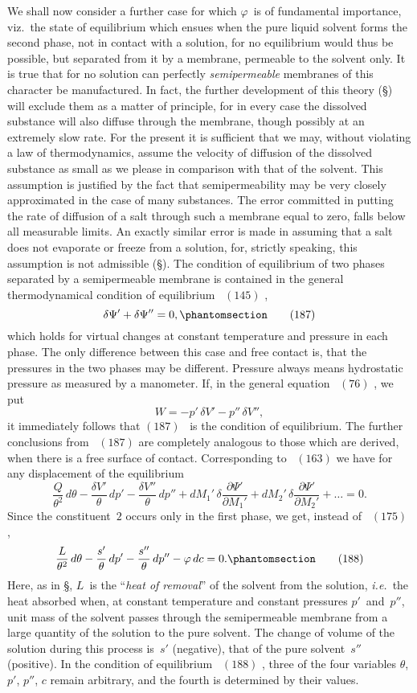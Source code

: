 \documentclass[12pt]{book}[2005/09/16]
\newcommand{\SecRef}[2][§\;]{\hyperref[section:#2.]{{\upshape #1#2}}}
\newcommand{\Tag}[1]{%
  \phantomsection\label{eqn:#1}\tag*{\ensuremath{#1}}%
}
\newcommand{\Eq}[1]{%
  \hyperref[eqn:#1]{\ensuremath{#1}}%
}
\newcommand{\PageSep}[1]{\ignorespaces}
\newcommand{\ie}{\emph{i.e.}}
\newcommand{\dd}{\partial}
\begin{document}
We shall now consider a further case for which $\varphi$~is of
%
%
fundamental importance, viz.\ the state of equilibrium which
ensues when the pure liquid solvent forms the second phase,
not in contact with a solution, for no equilibrium would
thus be possible, but separated from it by a membrane,
permeable to the solvent only. It is true that for no
solution can perfectly \emph{semipermeable} membranes of this character
be manufactured. In fact, the further development of
this theory (\SecRef{259}) will exclude them as a matter of principle,
for in every case the dissolved substance will also
diffuse through the membrane, though possibly at an
extremely slow rate. For the present it is sufficient that
we may, without violating a law of thermodynamics, assume
the velocity of diffusion of the dissolved substance as small
as we please in comparison with that of the solvent. This
assumption is justified by the fact that semipermeability
may be very closely approximated in the case of many
substances. The error committed in putting the rate of
diffusion of a salt through such a membrane equal to zero,
falls below all measurable limits. An exactly similar error
is made in assuming that a salt does not evaporate or
freeze from a solution, for, strictly speaking, this assumption
is not admissible (\SecRef{259}). The condition of equilibrium
of two phases separated by a semipermeable membrane is
contained in the general thermodynamical condition of
equilibrium~\Eq{(145)},
\[
\delta \Psi' + \delta \Psi'' = 0,
\Tag{(187)}
\]
which holds for virtual changes at constant temperature
and pressure in each phase. The only difference between
this case and free contact is, that the pressures in the two
phases may be different. Pressure always means hydrostatic
pressure as measured by a manometer. If, in the general
equation~\Eq{(76)}, we put
\[
W = -p'\, \delta V' - p''\, \delta V'',
\]
it immediately follows that \Eq{(187)}~is the condition of equilibrium.
The further conclusions from~\Eq{(187)} are completely
\PageSep{204}
analogous to those which are derived, when there is a free
surface of contact. Corresponding to~\Eq{(163)} we have for any
displacement of the equilibrium
\[
\frac{Q}{\theta^{2}}\, d\theta - \frac{\delta V'}{\theta}\, dp' - \frac{\delta V''}{\theta}\, dp''
  + dM_{1}'\, \delta \frac{\dd \Psi'}{\dd M_{1}'} + dM_{2}'\, \delta \frac{\dd \Psi'}{\dd M_{2}'} + \dots = 0.
\]
Since the constituent~$2$ occurs only in the first phase, we get,
instead of~\Eq{(175)},
\[
\frac{L}{\theta^{2}}\, d\theta - \frac{s'}{\theta}\, dp' - \frac{s''}{\theta}\, dp'' - \varphi\, dc = 0.
\Tag{(188)}
\]
Here, as in \SecRef{221}, $L$~is the ``\emph{heat of removal}'' of the solvent
from the solution, \ie\ the heat absorbed when, at constant
temperature and constant pressures $p'$~and~$p''$, unit mass of
the solvent passes through the semipermeable membrane
from a large quantity of the solution to the pure solvent.
The change of volume of the solution during this process
is~$s'$ (negative), that of the pure solvent~$s''$ (positive). In the
condition of equilibrium~\Eq{(188)}, three of the four variables
$\theta$, $p'$, $p''$, $c$ remain arbitrary, and the fourth is determined by
their values.
\end{document}

